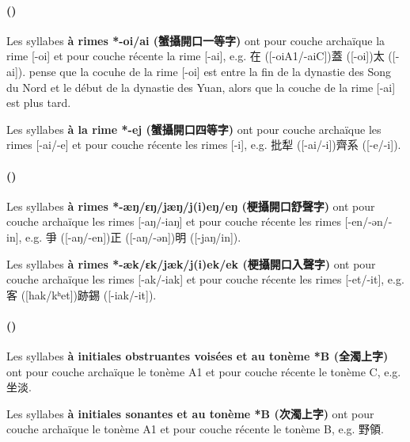 \documentclass{scrbook}
\newcounter{c}[subsubsection]
\newcommand{\stpc}[1]{\stepcounter{#1}}
\newcommand{\termyyx}[1]{\textbf{#1}}
\begin{document}
\begin{sloppypar}
\stpc{c}\paragraph{()}
Les syllabes \termyyx{à rimes *-oi/ai (蟹攝開口一等字)} ont pour couche archaïque la rime [-oi] et pour couche récente la rime [-ai], e.g. 在 ([-oiA1/-aiC])蓋 ([-oi])太 ([-ai]). \textcite[130, 136]{Liu2009hakka_xie} pense que la cocuhe de la rime [-oi] est entre la fin de la dynastie des Song du Nord et le début de la dynastie des Yuan, alors que la couche de la rime [-ai] est plus tard. 

Les syllabes \termyyx{à la rime *-ej (蟹攝開口四等字)} ont pour couche archaïque les rimes [-ai/-e] et pour couche récente les rimes [-i], e.g. 批犁 ([-ai/-i])齊系 ([-e/-i]). 

\stpc{c}\paragraph{()}
Les syllabes \termyyx{à rimes *-æŋ/ɛŋ/jæŋ/j(i)eŋ/eŋ (梗攝開口舒聲字)} ont pour couche archaïque les rimes [-aŋ/-iaŋ] et pour couche récente les rimes [-en/-ən/-in], e.g. 爭 ([-aŋ/-en])正 ([-aŋ/-ən])明 ([-jaŋ/in]).

Les syllabes \termyyx{à rimes *-æk/ɛk/jæk/j(i)ek/ek (梗攝開口入聲字)} ont pour couche archaïque les rimes [-ak/-iak] et pour couche récente les rimes [-et/-it], e.g. 客 ([hak/kʰet])跡錫 ([-iak/-it]). 

\stpc{c}\paragraph{()}
Les syllabes \termyyx{à initiales obstruantes voisées et au tonème *B (全濁上字)} ont pour couche archaïque le tonème A1 et pour couche récente le tonème C, e.g. 坐淡. 

Les syllabes \termyyx{à initiales sonantes et au tonème *B (次濁上字)} ont pour couche archaïque le tonème A1 et pour couche récente le tonème B, e.g. 野領. 


\end{sloppypar}
\end{document}
